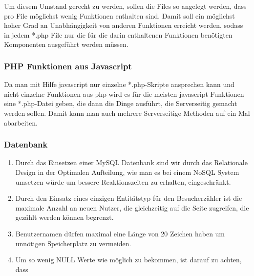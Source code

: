 \documentclass[10pt,a4paper]{scrartcl}
\begin{document}
Um diesem Umstand gerecht zu werden, sollen die Files so angelegt werden, dass pro File möglichst wenig Funktionen enthalten sind.
Damit soll ein möglichst hoher Grad an Unabhängigkeit von anderen Funktionen erreicht werden, sodass in jedem *.php File nur die 
für die darin enthaltenen Funktionen benötigten Komponenten ausgeführt werden müssen.

\subsubsection*{PHP Funktionen aus Javascript}

Da man mit Hilfe javascript nur einzelne *.php-Skripte ansprechen kann und nicht einzelne Funktionen aus php wird es für die meisten javascript-Funktionen eine *.php-Datei geben, die dann die Dinge ausführt, die Serverseitig gemacht werden sollen. Damit kann man auch mehrere Serverseitige Methoden auf ein Mal abarbeiten.


\subsubsection*{Datenbank}

\begin{enumerate}
 \item Durch das Einsetzen einer MySQL Datenbank sind wir durch das Relationale Design in der Optimalen Aufteilung, wie man es bei einem NoSQL System umsetzen würde um bessere Reaktionszeiten zu erhalten, eingeschränkt.
 \item Durch den Einsatz eines einzigen Entitätstyp für den Besucherzähler ist die maximale Anzahl an neuen Nutzer, die gleichzeitig auf die Seite zugreifen, die gezählt werden können begrenzt.
 \item Benutzernamen dürfen maximal eine Länge von 20 Zeichen haben um unnötigen Speicherplatz zu vermeiden.
 \item Um so wenig NULL Werte wie möglich zu bekommen, ist darauf zu achten, dass
\end{enumerate}

\end{document}
